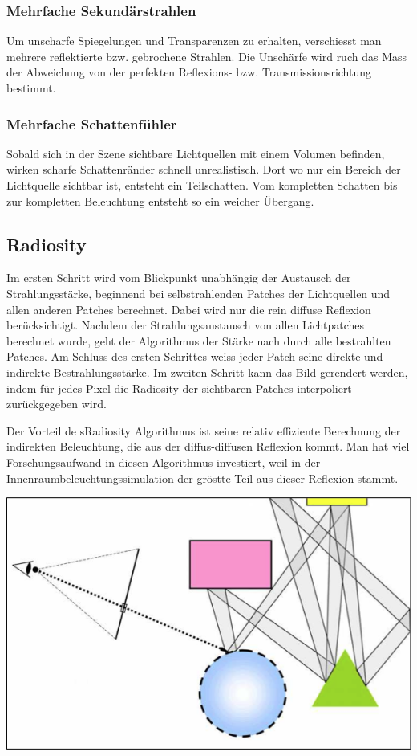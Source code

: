 \documentclass[10pt]{article}
\begin{document}
\subsubsection*{Mehrfache Sekundärstrahlen}
Um unscharfe Spiegelungen und Transparenzen zu erhalten, verschiesst man mehrere reflektierte bzw. gebrochene Strahlen. Die Unschärfe wird ruch das Mass der Abweichung von der perfekten Reflexions- bzw. Transmissionsrichtung bestimmt.
\subsubsection*{Mehrfache Schattenfühler}
Sobald sich in der Szene sichtbare Lichtquellen mit einem Volumen befinden, wirken scharfe Schattenränder schnell unrealistisch. Dort wo nur ein Bereich der Lichtquelle sichtbar ist, entsteht ein Teilschatten. Vom kompletten Schatten bis zur kompletten Beleuchtung entsteht so ein weicher Übergang.

\subsection{Radiosity}
Im ersten Schritt wird vom Blickpunkt unabhängig der Austausch der Strahlungsstärke, beginnend bei selbstrahlenden Patches der Lichtquellen und allen anderen Patches berechnet. Dabei wird nur die rein diffuse Reflexion berücksichtigt.  Nachdem der Strahlungsaustausch von allen Lichtpatches berechnet wurde, geht der Algorithmus der Stärke nach durch alle bestrahlten Patches. Am Schluss des ersten Schrittes weiss jeder Patch seine direkte und indirekte Bestrahlungsstärke. Im zweiten Schritt kann das Bild gerendert werden, indem für jedes Pixel die Radiosity der sichtbaren Patches interpoliert zurückgegeben wird.

Der Vorteil de sRadiosity Algorithmus ist seine relativ effiziente Berechnung der indirekten Beleuchtung, die aus der diffus-diffusen Reflexion kommt. Man hat viel Forschungsaufwand in diesen Algorithmus investiert, weil in der Innenraumbeleuchtungssimulation der gröstte Teil aus dieser Reflexion stammt.
\begin{center}
	\includegraphics[scale=0.4]{radiosity.png}
\end{center}
\end{document}
